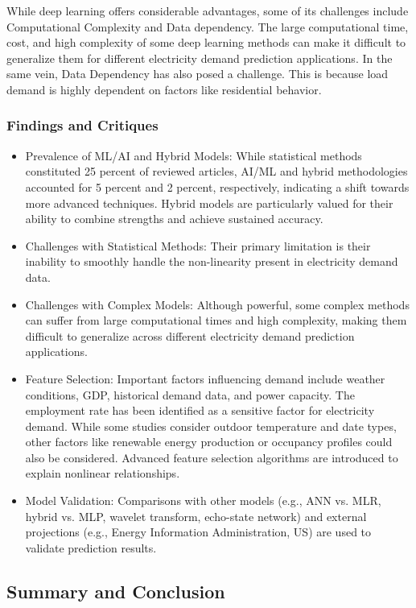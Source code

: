 While deep learning offers considerable advantages, some of its challenges include Computational Complexity and Data dependency. The large computational time, cost, and high complexity of some deep learning methods can make it difficult to generalize them for different electricity demand prediction applications. In the same vein, Data Dependency has also posed a challenge. This is because load demand is highly dependent on factors like residential behavior.


\subsubsection{Findings and Critiques} 
\begin{itemize}
    \item Prevalence of ML/AI and Hybrid Models: While statistical methods constituted 25 percent of reviewed articles, AI/ML and hybrid methodologies accounted for 5 percent and 2 percent, respectively, indicating a shift towards more advanced techniques. Hybrid models are particularly valued for their ability to combine strengths and achieve sustained accuracy.
    \item Challenges with Statistical Methods: Their primary limitation is their inability to smoothly handle the non-linearity present in electricity demand data.
    \item Challenges with Complex Models: Although powerful, some complex methods can suffer from large computational times and high complexity, making them difficult to generalize across different electricity demand prediction applications.
    \item Feature Selection: Important factors influencing demand include weather conditions, GDP, historical demand data, and power capacity. The employment rate has been identified as a sensitive factor for electricity demand. While some studies consider outdoor temperature and date types, other factors like renewable energy production or occupancy profiles could also be considered. Advanced feature selection algorithms are introduced to explain nonlinear relationships.
    \item Model Validation: Comparisons with other models (e.g., ANN vs. MLR, hybrid vs. MLP, wavelet transform, echo-state network) and external projections (e.g., Energy Information Administration, US) are used to validate prediction results.
\end{itemize}

\subsection{Summary and Conclusion}

